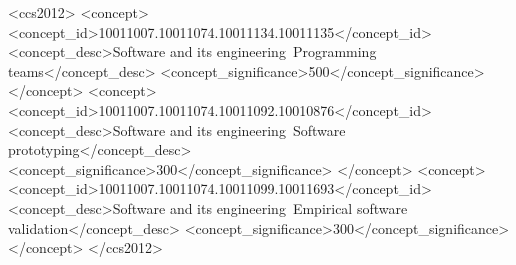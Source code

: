\begin{CCSXML}
	<ccs2012>
	<concept>
	<concept_id>10011007.10011074.10011134.10011135</concept_id>
	<concept_desc>Software and its engineering~Programming teams</concept_desc>
	<concept_significance>500</concept_significance>
	</concept>
	<concept>
	<concept_id>10011007.10011074.10011092.10010876</concept_id>
	<concept_desc>Software and its engineering~Software prototyping</concept_desc>
	<concept_significance>300</concept_significance>
	</concept>
	<concept>
	<concept_id>10011007.10011074.10011099.10011693</concept_id>
	<concept_desc>Software and its engineering~Empirical software validation</concept_desc>
	<concept_significance>300</concept_significance>
	</concept>
	</ccs2012>
\end{CCSXML}



\maketitle

